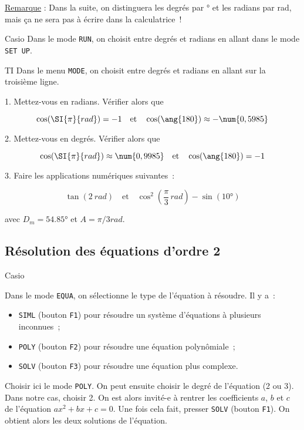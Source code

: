 \documentclass[a4paper, 12pt, final, garamond]{book}
\begin{document}
\underline{Remarque} : Dans la suite, on distinguera les degrés par \si{\degree}
et les radians par \si{rad}, mais ça ne sera pas à écrire dans la calculatrice~!

\begin{instruc}[]{Casio}
    Dans le mode \texttt{RUN}, on choisit entre degrés et radians en allant dans
    le mode \texttt{SET UP}.
\end{instruc}

\begin{instruc}{TI}
    Dans le menu \texttt{MODE}, on choisit entre degrés et radians en allant sur
    la troisième ligne.
\end{instruc}

1. Mettez-vous en radians. Vérifier alors que

\[\cos(\SI{\pi}{rad}) = -1 \quad\text{et}\quad \cos(\ang{180}) \approx
-\num{0,5985}\]

\medskip

2. Mettez-vous en degrés. Vérifier alors que

\[\cos(\SI{\pi}{rad}) \approx \num{0,9985} \quad\text{et}\quad
\cos(\ang{180}) =-1\]

\medskip

3. Faire les applications numériques suivantes~:

\[\tan(\SI{2}{rad}) \quad\text{et}\quad \cos^2\left(\frac{\pi}{3}\,\si{rad}\right)
-\sin(\ang{10;;}) \]

\vspace{2cm}


avec $D_m = \ang{54.85}$ et $A = \pi/3 \si{rad}$.

\subsection{R\'esolution des équations d'ordre 2}

\begin{instruc}{Casio}
    
    Dans le mode \texttt{EQUA}, on sélectionne le type de l'équation à résoudre.
    Il y a~: 
    
    \begin{itemize}
        \item \texttt{SIML} (bouton \texttt{F1}) pour résoudre un système
            d'équations à plusieurs inconnues~;
        \item \texttt{POLY} (bouton \texttt{F2}) pour résoudre une équation
            polynômiale~;
        \item \texttt{SOLV} (bouton \texttt{F3}) pour résoudre une équation plus
            complexe.
    \end{itemize}

Choisir ici le mode \texttt{POLY}. On peut ensuite choisir le degré de
l'équation (2 ou 3). Dans notre cas, choisir 2. On est alors invité-e à rentrer
les coefficients $a$, $b$ et $c$ de l'équation $ax^2+bx+c=0$. Une fois cela
fait, presser \texttt{SOLV} (bouton \texttt{F1}). On obtient alors les deux
solutions de l'équation. 
\end{instruc}
\end{document}
